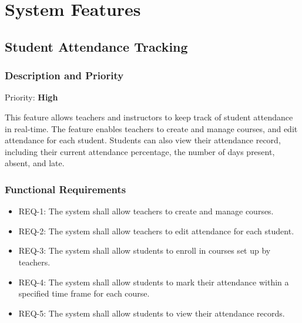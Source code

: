 \documentclass{scrreprt}
\begin{document}
\chapter{System Features}

\section{Student Attendance Tracking}


\subsection{Description and Priority}
Priority: \textbf{High}

This feature allows teachers and instructors to keep track of student attendance in real-time.
The feature enables teachers to create and manage courses, and edit attendance for each student.
Students can also view their attendance record, including their current attendance percentage, the number of days present, absent, and late.

\subsection{Functional Requirements}
\begin{itemize}
    \item REQ-1: The system shall allow teachers to create and manage courses.
    \item REQ-2: The system shall allow teachers to edit attendance for each student.
    \item REQ-3: The system shall allow students to enroll in courses set up by teachers. 
    \item REQ-4: The system shall allow students to mark their attendance within a specified time frame for each course.
    \item REQ-5: The system shall allow students to view their attendance records.
\end{itemize}
\end{document}

